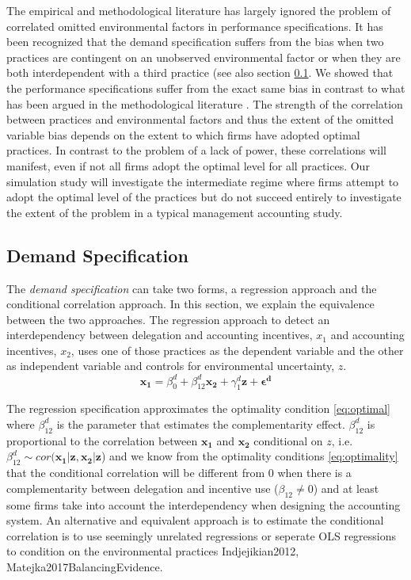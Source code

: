 \documentclass[12pt]{article}
\begin{document}
The empirical and methodological literature has largely ignored the problem of correlated omitted environmental factors in performance specifications. It has been recognized that the demand specification suffers from the bias when two practices are contingent on an unobserved environmental factor or when they are both interdependent with a third practice (see also section \ref{demand-specification}. We showed that the performance specifications suffer from the exact same bias in contrast to what has been argued in the methodological literature \citep{Carree2011}. The strength of the correlation between practices and environmental factors and thus the extent of the omitted variable bias depends on the extent to which firms have adopted optimal practices. In contrast to the problem of a lack of power, these correlations will manifest, even if not all firms adopt the optimal level for all practices. Our simulation study will investigate the intermediate regime where firms attempt to adopt the optimal level of the practices but do not succeed entirely to investigate the extent of the problem in a typical management accounting study.

\subsection{Demand Specification}\label{demand-specification}

The \emph{demand specification} can take two forms, a regression approach and the conditional correlation approach. In this section, we explain the equivalence between the two approaches. The regression  approach to detect an interdependency between delegation and accounting incentives, $x_1$ and accounting incentives, $x_2$, uses one of those practices as the dependent variable and the other as independent variable and controls for environmental uncertainty, $z$.
\begin{equation*} 
\mathbf{x_1} = \beta_0^d + \beta_{12}^d \mathbf{x_2} 
        + \gamma_{1}^d \mathbf{z}
        + \mathbf{\epsilon^d}
\end{equation*}

The regression specification approximates the optimality condition  \eqref{eq:optimal} where \(\beta^d_{12}\) is the parameter that estimates the complementarity effect. $\beta_{12}^d$ is proportional to the  correlation between $\mathbf{x_1}$ and $\mathbf{x_2}$ conditional on $z$, i.e. $\beta_{12}^d \sim cor(\mathbf{x_1} | \mathbf{z}, \mathbf{x_2 | \mathbf{z}}$) and we know from the optimality conditions \eqref{eq:optimality} that the conditional correlation will be different from 0 when there is a complementarity between delegation and incentive use ($\beta_{12} \neq 0$) and at least some firms take into account the interdependency when designing the accounting system. An alternative and equivalent approach is to estimate the conditional correlation is to use seemingly unrelated regressions or seperate OLS regressions to condition on the environmental practices \citep{Indjejikian2012, Matejka2017BalancingEvidence} {Indjejikian2012, Matejka2017BalancingEvidence}. 
\end{document}
